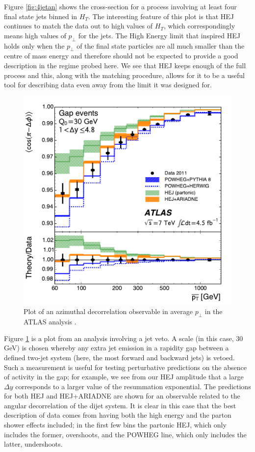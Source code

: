 Figure \ref{fig:4jetan} shows the cross-section for a process involving at least four final state jets binned in $H_T$. The interesting feature of this plot is that HEJ continues to match the data out to high values of $H_T$, which correspondingly means high values of $p_\perp$ for the jets. The High Energy limit that inspired HEJ holds only when the $p_\perp$ of the final state particles are all much smaller than the centre of mass energy and therefore should not be expected to provide a good description in the regime probed here. We see that HEJ keeps enough of the full process and this, along with the matching procedure, allows for it to be a useful tool for describing data even away from the limit it was designed for.

\begin{figure}[t]
\centering
\includegraphics[scale=0.8]{Images/hej_powheg_agree.pdf} 
\caption{Plot of an azimuthal decorrelation observable in average $p_\perp$ in the ATLAS analysis \cite{Aad2014}.}
\label{fig:vetoptbar}
\end{figure}

Figure \ref{fig:vetoptbar} is a plot from an analysis involving a jet veto. A scale (in this case, 30 GeV) is chosen whereby any extra jet emission in a rapidity gap between a defined two-jet system (here, the most forward and backward jets) is vetoed. Such a measurement is useful for testing perturbative predictions on the absence of activity in the gap; for example, we see from our HEJ amplitude that a large $\Delta y$ corresponds to a larger value of the resummation exponential. The predictions for both HEJ and HEJ+ARIADNE are shown for an observable related to the angular decorrelation of the dijet system. It is clear in this case that the best description of data comes from having both the high energy and the parton shower effects included; in the first few bins the partonic HEJ, which only includes the former, overshoots, and the POWHEG line, which only includes the latter, undershoots. 

